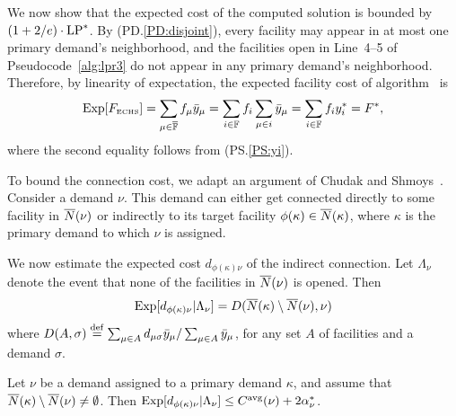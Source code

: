 
\smallskip
We now show that the expected cost of the computed solution is bounded by
$(1+2/e) \cdot \mbox{\rm LP}^\ast$. By
(PD.\ref{PD:disjoint}), every facility may appear in at
most one primary demand's neighborhood, and the facilities
open in Line~4--5 of Pseudocode~\ref{alg:lpr3} do not appear
in any primary demand's neighborhood. Therefore, by
linearity of expectation, the expected facility cost of
algorithm~{\ECHS} is 
%
\begin{equation*}
\mbox{\rm Exp}[F_{\mbox{\tiny\rm ECHS}}] 
	= \sum_{\mu\in\overline{\mathbb{F}}} f_\mu {\bar y}_{\mu} 
	= \sum_{i\in\mathbb{F}} f_i\sum_{\mu\in i} {\bar y}_{\mu} 
	= \sum_{i\in\mathbb{F}} f_i y_i^\ast = F^\ast,
\end{equation*}
%
where the second equality follows from (PS.\ref{PS:yi}).

\smallskip

To bound the connection cost, we adapt an argument of Chudak
and Shmoys~\cite{ChudakS04}. Consider a demand $\nu$. This
demand can either get connected directly to some facility in
${\overline{N}}(\nu)$ or indirectly to its target facility $\phi(\kappa)\in
{\overline{N}}(\kappa)$, where $\kappa$ is the primary demand to
which $\nu$ is assigned.

We now estimate the expected cost $d_{\phi(\kappa)\nu}$ of the indirect
connection. Let $\Lambda_\nu$ denote the event that none of the
facilities in ${\overline{N}}(\nu)$ is opened. Then
%
\begin{equation*}
	\mbox{\rm Exp}[ d_{\phi(\kappa)\nu} | \Lambda_\nu] 
			= D({\overline{N}}(\kappa) \setminus {\overline{N}}(\nu), \nu)
\end{equation*}
%
where $D(A,\sigma) \stackrel{\mathrm{def}}{=}\sum_{\mu\in A}
d_{\mu\sigma}{\bar y}_{\mu}/\sum_{\mu\in A} {\bar y}_{\mu}$, for
any set $A$ of facilities and a demand $\sigma$.


\begin{lemma}
  \label{lem:echu indirect}
  Let $\nu$ be a demand assigned to a primary demand $\kappa$, and
assume that ${\overline{N}}(\kappa) \setminus {\overline{N}}(\nu)\neq\emptyset$.
Then $\mbox{\rm Exp}[ d_{\phi(\kappa)\nu} | \Lambda_\nu]  \leq
  		C^{{\mbox{\scriptsize\rm avg}}}(\nu)+2\alpha_{\nu}^\ast$.
\end{lemma}

